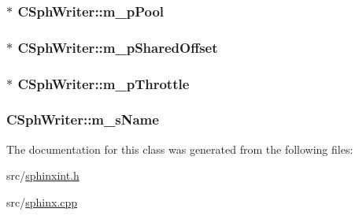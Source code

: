 \hypertarget{classCSphWriter_abbb485d6e77f4c5bc57672de79606b9c}{
\subsubsection[{m\-\_\-p\-Pool}]{$\ast$ C\-Sph\-Writer\-::m\-\_\-p\-Pool\hspace{0.3cm}{\ttfamily [protected]}}}\label{classCSphWriter_abbb485d6e77f4c5bc57672de79606b9c}
\hypertarget{classCSphWriter_a294466e5763d07e3bdcab322bb326495}{
\subsubsection[{m\-\_\-p\-Shared\-Offset}]{$\ast$ C\-Sph\-Writer\-::m\-\_\-p\-Shared\-Offset\hspace{0.3cm}{\ttfamily [protected]}}}\label{classCSphWriter_a294466e5763d07e3bdcab322bb326495}
\hypertarget{classCSphWriter_a7a3c2e9afb46c10678157fd4946e538c}{
\subsubsection[{m\-\_\-p\-Throttle}]{$\ast$ C\-Sph\-Writer\-::m\-\_\-p\-Throttle\hspace{0.3cm}{\ttfamily [protected]}}}\label{classCSphWriter_a7a3c2e9afb46c10678157fd4946e538c}
\hypertarget{classCSphWriter_a462ad0ec99a0a463dc2f0b8bda154c37}{
\subsubsection[{m\-\_\-s\-Name}]{ C\-Sph\-Writer\-::m\-\_\-s\-Name\hspace{0.3cm}{\ttfamily [protected]}}}\label{classCSphWriter_a462ad0ec99a0a463dc2f0b8bda154c37}


The documentation for this class was generated from the following files\-:\begin{DoxyCompactItemize}
\item 
src/\hyperlink{sphinxint_8h}{sphinxint.\-h}\item 
src/\hyperlink{sphinx_8cpp}{sphinx.\-cpp}\end{DoxyCompactItemize}
